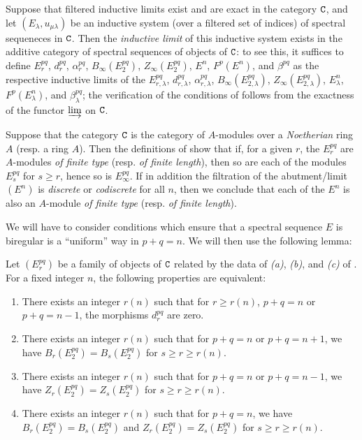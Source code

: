 \begin{env}[11.1.7]
\label{0.11.1.7}
Suppose that filtered inductive limits exist and are exact in the category $\mathtt{C}$, and let $(E_\lambda,u_{\mu\lambda})$ be an inductive system (over a filtered set of indices) of spectral sequeneces in $\mathtt{C}$.
Then the \emph{inductive limit} of this inductive system exists in the additive category of spectral sequences of objects of $\mathtt{C}$: to see this, it suffices to define $E_r^{pq}$, $d_r^{pq}$, $\alpha_r^{pq}$, $B_\infty(E_2^{pq})$, $Z_\infty(E_2^{pq})$, $E^n$, $F^p(E^n)$, and $\beta^{pq}$ as the respective inductive limits of the $E_{r,\lambda}^{pq}$, $d_{r,\lambda}^{pq}$, $\alpha_{r,\lambda}^{pq}$, $B_\infty(E_{2,\lambda}^{pq})$, $Z_\infty(E_{2,\lambda}^{pq})$, $E_\lambda^n$, $F^p(E_\lambda^n)$, and $\beta_\lambda^{pq}$; the verification of the conditions of  follows from the exactness of the functor $\varinjlim$ on $\mathtt{C}$.
\end{env}

\begin{rmk}[11.1.8]
\label{0.11.1.8}
Suppose that the category $\mathtt{C}$ is the category of $A$-modules over a \emph{Noetherian} ring $A$ (resp. a ring $A$).
Then the definitions of  show that if, for a given $r$, the $E_r^{pq}$ are $A$-modules \emph{of finite type} (resp. \emph{of finite length}), then so are each of the modules $E_s^{pq}$ for $s\geqslant r$, hence so is $E_\infty^{pq}$.
If in addition the filtration of the abutment/limit $(E^n)$ is \emph{discrete} or \emph{codiscrete} for all $n$, then we conclude that each of the $E^n$ is also an $A$-module \emph{of finite type} (resp. \emph{of finite length}).
\end{rmk}

\begin{env}[11.1.9]
\label{0.11.1.9}
We will have to consider conditions which ensure that a spectral sequence $E$ is biregular is a ``uniform'' way in $p+q=n$.
We will then use the following lemma:
\end{env}

\begin{lem}[11.1.10]
\label{0.11.1.10}
Let $(E_r^{pq})$ be a family of objects of $\mathtt{C}$ related by the data of \emph{(a)}, \emph{(b)}, and \emph{(c)} of .
For a fixed integer $n$, the following properties are equivalent:
\begin{enumerate}[label=\emph{(\alph*)}]
  \item There exists an integer $r(n)$ such that for $r\geqslant r(n)$, $p+q=n$ or $p+q=n-1$, the morphisms $d_r^{pq}$ are zero.
  \item There exists an integer $r(n)$ such that for $p+q=n$ or $p+q=n+1$, we have $B_r(E_2^{pq})=B_s(E_2^{pq})$ for $s\geqslant r\geqslant r(n)$.
  \item There exists an integer $r(n)$ such that for $p+q=n$ or $p+q=n-1$, we have $Z_r(E_2^{pq})=Z_s(E_2^{pq})$ for $s\geqslant r\geqslant r(n)$.
  \item There exists an integer $r(n)$ such that for $p+q=n$, we have $B_r(E_2^{pq})=B_s(E_2^{pq})$ and $Z_r(E_2^{pq})=Z_s(E_2^{pq})$ for $s\geqslant r\geqslant r(n)$.
\end{enumerate}
\end{lem}


